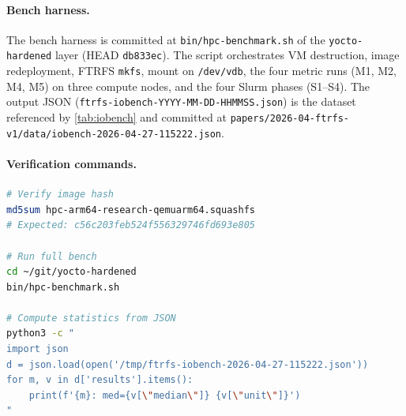 \paragraph{Bench harness.}
The bench harness is committed at \texttt{bin/hpc-benchmark.sh} of
the \texttt{yocto-hardened} layer (HEAD \texttt{db833ec}). The
script orchestrates VM destruction, image redeployment, FTRFS
\texttt{mkfs}, mount on \texttt{/dev/vdb}, the four metric runs
(M1, M2, M4, M5) on three compute nodes, and the four Slurm
phases (S1--S4). The output JSON
(\texttt{ftrfs-iobench-YYYY-MM-DD-HHMMSS.json}) is the dataset
referenced by \cref{tab:iobench} and committed at
\texttt{papers/2026-04-ftrfs-v1/data/iobench-2026-04-27-115222.json}.

\paragraph{Verification commands.}
\begin{lstlisting}[language=bash]
# Verify image hash
md5sum hpc-arm64-research-qemuarm64.squashfs
# Expected: c56c203feb524f556329746fd693e805

# Run full bench
cd ~/git/yocto-hardened
bin/hpc-benchmark.sh

# Compute statistics from JSON
python3 -c "
import json
d = json.load(open('/tmp/ftrfs-iobench-2026-04-27-115222.json'))
for m, v in d['results'].items():
    print(f'{m}: med={v[\"median\"]} {v[\"unit\"]}')
"
\end{lstlisting}
